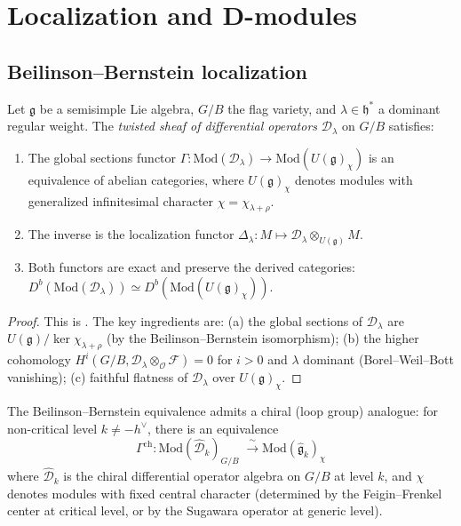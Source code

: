 \section{Localization and D-modules}\label{sec:localization}

\subsection{Beilinson--Bernstein localization}

\begin{theorem}
\label{thm:beilinson-bernstein}
Let $\mathfrak{g}$ be a semisimple Lie algebra, $G/B$ the flag variety,
and $\lambda \in \mathfrak{h}^*$ a dominant regular weight.  The
\emph{twisted sheaf of differential operators}
$\mathcal{D}_\lambda$ on $G/B$ satisfies:
\begin{enumerate}[label=\textup{(\roman*)}]
\item The global sections functor $\Gamma: \mathrm{Mod}(\mathcal{D}_\lambda)
  \to \mathrm{Mod}(U(\mathfrak{g})_\chi)$ is an equivalence
  of abelian categories, where $U(\mathfrak{g})_\chi$ denotes
  modules with generalized infinitesimal character
  $\chi = \chi_{\lambda+\rho}$.
\item The inverse is the localization functor
  $\Delta_\lambda: M \mapsto \mathcal{D}_\lambda \otimes_{U(\mathfrak{g})} M$.
\item Both functors are exact and preserve the derived categories:
  $D^b(\mathrm{Mod}(\mathcal{D}_\lambda))
  \simeq D^b(\mathrm{Mod}(U(\mathfrak{g})_\chi))$.
\end{enumerate}
\end{theorem}

\begin{proof}
This is \cite[Theorem~1.1]{BB81}.
The key ingredients are: (a) the global sections of
$\mathcal{D}_\lambda$ are $U(\mathfrak{g})/\ker\chi_{\lambda+\rho}$
(by the Beilinson--Bernstein isomorphism); (b) the higher cohomology
$H^i(G/B, \mathcal{D}_\lambda \otimes_{\mathcal{O}} \mathcal{F}) = 0$
for $i > 0$ and $\lambda$ dominant (Borel--Weil--Bott vanishing);
(c) faithful flatness of $\mathcal{D}_\lambda$ over
$U(\mathfrak{g})_\chi$.
\end{proof}

\begin{theorem}
\label{thm:chiral-localization}
The Beilinson--Bernstein equivalence admits a chiral (loop group)
analogue: for non-critical level $k \neq -h^\vee$, there is an
equivalence
\[
\Gamma^{\mathrm{ch}}:
\mathrm{Mod}(\widehat{\mathcal{D}}_k)_{G/B}
\;\xrightarrow{\;\sim\;}
\mathrm{Mod}(\widehat{\mathfrak{g}}_k)_\chi
\]
where $\widehat{\mathcal{D}}_k$ is the chiral differential operator
algebra on $G/B$ at level $k$, and $\chi$ denotes modules with
fixed central character \textup{(}determined by the Feigin--Frenkel
center at critical level, or by the Sugawara operator at generic
level\textup{)}.
\end{theorem}

